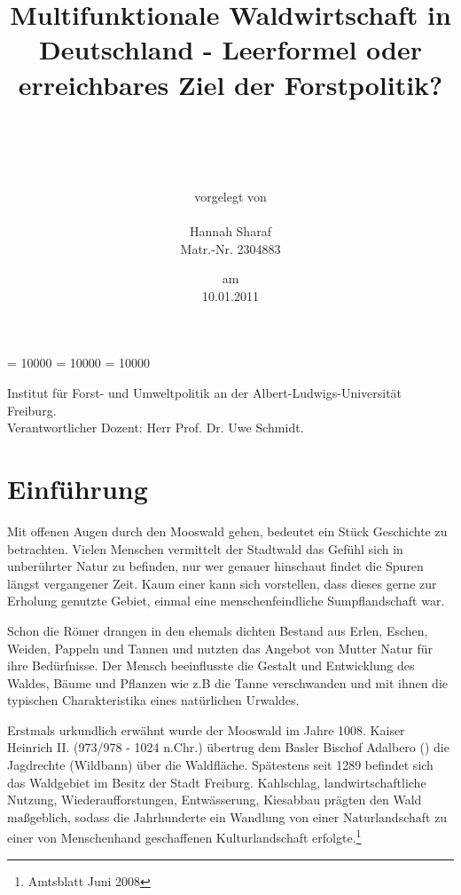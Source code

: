 \documentclass[12pt]{article}
\begin{document}
\clubpenalty = 10000
\widowpenalty = 10000 
\displaywidowpenalty = 10000

\onehalfspacing 


\begin{titlepage}

\title{Multifunktionale Waldwirtschaft in Deutschland - Leerformel oder erreichbares Ziel der Forstpolitik?}
\author{\\ \\ \\ \\ vorgelegt von \\ \\ Hannah Sharaf \\ Matr.-Nr. 2304883}
\date{am \\ 10.01.2011}
\maketitle
\vfill {\noindent Institut für Forst- und Umweltpolitik an der Albert-Ludwigs-Universität Freiburg. \\ Verantwortlicher Dozent: Herr Prof. Dr. Uwe Schmidt.}
\thispagestyle{empty}
\newpage

\end{titlepage} 


\section*{Einführung}
Mit offenen Augen durch den Mooswald gehen, bedeutet ein Stück Geschichte zu betrachten.
Vielen Menschen vermittelt der Stadtwald das Gefühl sich in unberührter Natur zu befinden, nur
wer genauer hinschaut findet die Spuren längst vergangener Zeit. Kaum einer kann sich vorstellen, 
dass dieses gerne zur Erholung genutzte Gebiet, einmal eine menschenfeindliche Sumpflandschaft war.

Schon die Römer drangen in den ehemals dichten Bestand aus Erlen, Eschen, Weiden, Pappeln und Tannen 
und nutzten das Angebot von Mutter Natur für ihre Bedürfnisse.
Der Mensch beeinflusste die Gestalt und Entwicklung des Waldes, Bäume und Pflanzen wie z.B die Tanne
verschwanden und mit ihnen die typischen Charakteristika eines natürlichen Urwaldes.

Erstmals urkundlich erwähnt wurde der Mooswald im Jahre 1008. Kaiser Heinrich II. (973/978 - 1024 n.Chr.) 
übertrug dem Basler Bischof Adalbero () die Jagdrechte (Wildbann) über die Waldfläche. Spätestens seit 1289 
befindet sich das Waldgebiet im Besitz der Stadt Freiburg. Kahlschlag, landwirtschaftliche Nutzung, 
Wiederaufforstungen, Entwässerung, Kiesabbau prägten den Wald maßgeblich, sodass die Jahrhunderte ein
Wandlung von einer Naturlandschaft zu einer von Menschenhand geschaffenen Kulturlandschaft erfolgte.\footnote{Amtsblatt Juni 2008}
\end{document}
